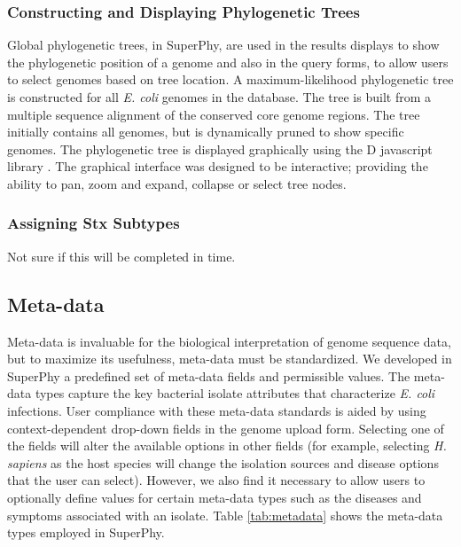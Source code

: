 \documentclass[a4paper,twoside]{article}
\begin{document}
\subsubsection{Constructing and Displaying Phylogenetic Trees}

Global phylogenetic trees, in SuperPhy, are used in the results displays to show the phylogenetic position of a genome and also in the query forms, to allow users to select genomes based on tree location. A maximum-likelihood phylogenetic tree is constructed for all \textit{E. coli} genomes in the database. The tree is built from a multiple sequence alignment of the conserved core genome regions. The tree initially contains all genomes, but is dynamically pruned to show specific genomes. The phylogenetic tree is displayed graphically using the D javascript library \cite{bostock2011d3}. The graphical interface was designed to be interactive; providing the ability to pan, zoom and expand, collapse or select tree nodes.


\subsubsection{Assigning Stx Subtypes}

Not sure if this will be completed in time.

\subsection{Meta-data}

Meta-data is invaluable for the biological interpretation of genome sequence data, but to maximize its usefulness, meta-data must be standardized. We developed in SuperPhy a predefined set of meta-data fields and permissible values. The meta-data types capture the key bacterial isolate attributes that characterize \textit{E. coli} infections. User compliance with these meta-data standards is aided by using context-dependent drop-down fields in the genome upload form. Selecting one of the fields will alter the available options in other fields (for example, selecting \textit{H. sapiens} as the host species will change the isolation sources and disease options that the user can select).  However, we also find it necessary to allow users to optionally define values for certain meta-data types such as the diseases and symptoms associated with an isolate. Table \ref{tab:metadata} shows the meta-data types employed in SuperPhy.
\end{document}
